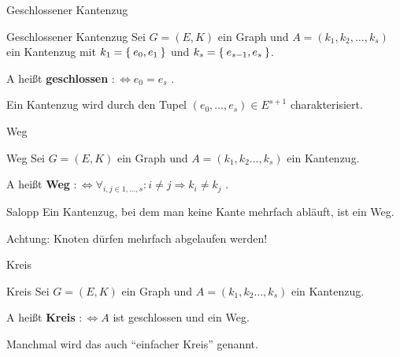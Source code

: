 \begin{frame}{Geschlossener Kantenzug}
\begin{block}{Geschlossener Kantenzug}
Sei $G = (E, K)$ ein Graph und $A = (k_1, k_2, \dots, k_s)$ ein Kantenzug
mit $k_1 = \Set{e_0, e_1}$ und $k_s = \Set{e_{s-1}, e_s}$.

A heißt \textbf{geschlossen} $:\Leftrightarrow e_0 = e_s$ .
\end{block}

Ein Kantenzug wird durch den Tupel $(e_0, \dots, e_s) \in E^{s+1}$
charakterisiert.

\begin{gallery}
\end{gallery}
\end{frame}

\begin{frame}{Weg}
\begin{block}{Weg}
Sei $G = (E, K)$ ein Graph und $A = (k_1, k_2 \dots, k_s)$ ein Kantenzug.

A heißt \textbf{Weg} $:\Leftrightarrow \forall_{i, j \in 1, \dots, s}: i \neq j \Rightarrow k_i \neq k_j$ .
\end{block}

\pause

\begin{exampleblock}{Salopp}
Ein Kantenzug, bei dem man keine Kante mehrfach abläuft, ist ein Weg.
\end{exampleblock}

\pause

Achtung: Knoten dürfen mehrfach abgelaufen werden!
\end{frame}

\begin{frame}{Kreis}
\begin{block}{Kreis}
Sei $G = (E, K)$ ein Graph und $A = (k_1, k_2 \dots, k_s)$ ein Kantenzug.

A heißt \textbf{Kreis} $:\Leftrightarrow A$ ist geschlossen und ein Weg.
\end{block}

\pause

Manchmal wird das auch "`einfacher Kreis"' genannt.

\pause

\begin{gallery}
\end{gallery}
\end{frame}

